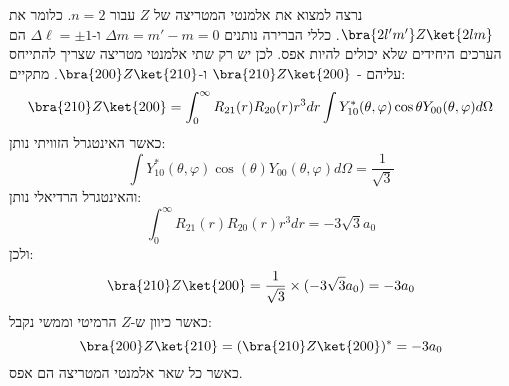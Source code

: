 \documentclass{tstextbook}
\begin{document}
\begin{example}
נרצה למצוא את אלמנטי המטריצה של \(Z\) עבור \(n=2\). כלומר את \(\bra{2l'm'}Z\ket{2lm}\). כללי הברירה נותנים \(\Delta m=m'-m=0\) ו-\(\Delta \ell=\pm 1\) הם הערכים היחידים שלא יכולים להיות אפס. לכן יש רק שתי אלמנטי מטריצה שצריך להתייחס עליהם - \(\bra{210}Z\ket{200}\) ו-\(\bra{200}Z\ket{210}\). מתקיים:
$$ \bra{210}Z\ket{200} = \int_0^\infty R_{21}(r) R_{20}(r) r^3 dr \int Y_{10}^*(\theta, \varphi) \cos \theta Y_{00}(\theta, \varphi) d\Omega $$
כאשר האינטגרל הזוויתי נותן:
$$ \int Y_{10}^*\left( \theta, \varphi \right) \cos \left( \theta \right) Y_{00}\left( \theta, \varphi \right) d\Omega = \frac{1}{\sqrt{3}} $$
והאינטגרל הרדיאלי נותן:
$$ \int_0^\infty R_{21}(r) R_{20}(r) r^3 dr = -3\sqrt{3} a_0 $$
ולכן:
$$\bra{210}Z\ket{200} = \frac{1}{\sqrt{3}} \times (-3\sqrt{3} a_0) = -3 a_0 $$
כאשר כיוון ש-\(Z\) הרמיטי וממשי נקבל:
$$\bra{200}Z\ket{210} = (\bra{210}Z\ket{200})^* = -3 a_0 $$
כאשר כל שאר אלמנטי המטריצה הם אפס.

\end{example}
\end{document}
